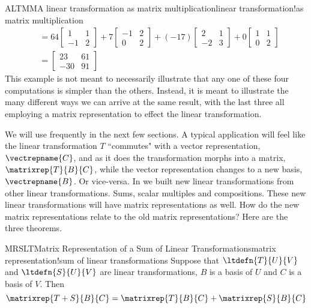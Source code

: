 \begin{example}{ALTMM}{A linear transformation as matrix multiplication}{linear transformation!as matrix multiplication}
\begin{align*}
%
&=
64\begin{bmatrix}1&1\\-1&2\end{bmatrix}+
7\begin{bmatrix}-1&2\\0&2\end{bmatrix}+
(-17)\begin{bmatrix}2&1\\-2&3\end{bmatrix}+
0\begin{bmatrix}1&1\\0&2\end{bmatrix}\\
%
&=
\begin{bmatrix}
23 & 61 \\ -30 & 91
\end{bmatrix}
\end{align*}
%
This example is not meant to necessarily illustrate that any one of these four computations is simpler than the others.  Instead, it is meant to illustrate the many different ways we can arrive at the same result, with the last three all employing a matrix representation to effect the linear transformation.
%
\end{example}
%
We will use  frequently in the next few sections.  A typical application will feel like the linear transformation $T$ ``commutes" with a vector representation, $\vectrepname{C}$, and as it does the transformation morphs into a matrix, $\matrixrep{T}{B}{C}$, while the vector representation changes to a new basis, $\vectrepname{B}$.  Or vice-versa.
%
%
In  we built new linear transformations from other linear transformations.  Sums, scalar multiples and compositions.  These new linear transformations will have matrix representations as well.  How do the new matrix representations relate to the old matrix representations?  Here are the three theorems.
%
\begin{theorem}{MRSLT}{Matrix Representation of a Sum of Linear Transformations}{matrix representation!sum of linear transformations}
Suppose that $\ltdefn{T}{U}{V}$ and $\ltdefn{S}{U}{V}$ are linear transformations, $B$ is a basis of $U$ and $C$ is a basis of $V$.  Then
%
\begin{equation*}
\matrixrep{T+S}{B}{C}=\matrixrep{T}{B}{C}+\matrixrep{S}{B}{C}
\end{equation*}
%
\end{theorem}
%
